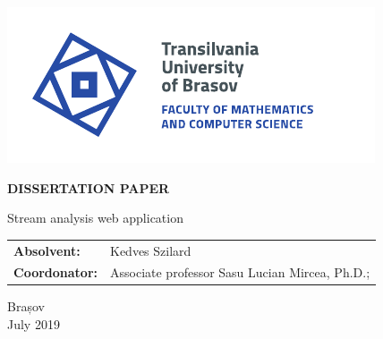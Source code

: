 \begin{titlepage}
	
	\vspace*{-3cm}
	\hspace{-2cm}
	\includegraphics[width=0.8\linewidth]{./images/Logo-UT-MI-SPOT-EN} %
	
	\begin{center}
		\Huge
		
		\vspace{2cm}
		
		\textbf{DISSERTATION PAPER}
		
		\vspace{1cm}
		
		\LARGE
		Stream analysis web application
		
		\vfill
		
		\Large
		\begin{tabular}{ll}
			\textbf{Absolvent:}&Kedves Szilard\\
			\textbf{Coordonator:}&Associate professor Sasu Lucian Mircea, Ph.D.;
		\end{tabular}
		
		\vfill
		
		\Large
		Brașov\\
		July 2019
		
	\end{center}
\end{titlepage}